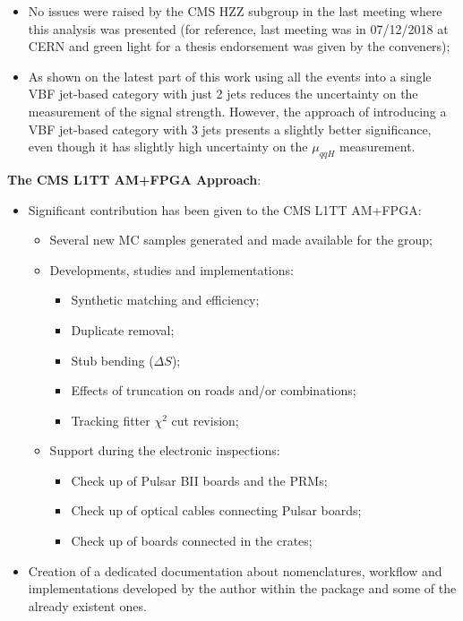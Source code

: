 \begin{itemize}
	\item No issues were raised by the CMS HZZ subgroup in the last meeting where this analysis was presented (for reference, last meeting was in 07/12/2018 at CERN and green light for a thesis endorsement was given by the conveners);
	\item As shown on the latest part of this work using all the events into a single VBF jet-based category with just 2 jets reduces the uncertainty on the measurement of the signal strength. However, the approach of introducing a VBF jet-based category with 3 jets presents a slightly better significance, even though it has slightly high uncertainty on the $\mu_{qqH}$ measurement.
\end{itemize}

{\flushleft \textbf{The CMS L1TT AM+FPGA Approach}:}
\begin{itemize}
	\item Significant contribution has been given to the CMS L1TT AM+FPGA:
	\begin{itemize}
		\item Several new MC samples generated and made available for the group;
		\item Developments, studies and implementations:
		\begin{itemize}
			\item Synthetic matching and efficiency;
			\item Duplicate removal;
			\item Stub bending ($\Delta S$);
			\item Effects of truncation on roads and/or combinations;
			\item Tracking fitter $\chi^{2}$ cut revision;
		\end{itemize}
		\item Support during the electronic inspections:
		\begin{itemize}
			\item Check up of Pulsar BII boards and the PRMs;
			\item Check up of optical cables connecting Pulsar boards;
			\item Check up of boards connected in the crates;
		\end{itemize}
	\end{itemize}
\end{itemize}
\begin{itemize}
	\item Creation of a dedicated documentation about nomenclatures, workflow and implementations developed by the author within the package and some of the already existent ones.
\end{itemize}


